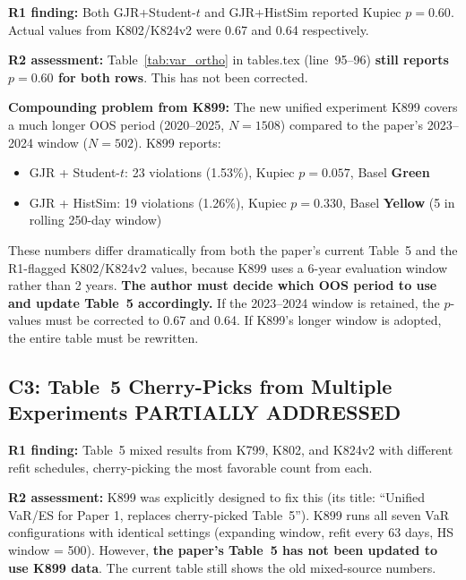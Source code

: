 \documentclass[12pt,a4paper]{article}
\begin{document}
\textbf{R1 finding:} Both GJR+Student-$t$ and GJR+HistSim reported Kupiec $p = 0.60$. Actual values from K802/K824v2 were 0.67 and 0.64 respectively.

\textbf{R2 assessment:} Table~\ref{tab:var_ortho} in tables.tex (line~95--96) \textbf{still reports $p = 0.60$ for both rows}. This has not been corrected.

\textbf{Compounding problem from K899:} The new unified experiment K899 covers a much longer OOS period (2020--2025, $N = 1508$) compared to the paper's 2023--2024 window ($N = 502$). K899 reports:
\begin{itemize}[nosep]
\item GJR + Student-$t$: 23 violations (1.53\%), Kupiec $p = 0.057$, Basel \textbf{Green}
\item GJR + HistSim: 19 violations (1.26\%), Kupiec $p = 0.330$, Basel \textbf{Yellow} (5 in rolling 250-day window)
\end{itemize}
These numbers differ dramatically from both the paper's current Table~5 and the R1-flagged K802/K824v2 values, because K899 uses a 6-year evaluation window rather than 2 years. \textbf{The author must decide which OOS period to use and update Table~5 accordingly.} If the 2023--2024 window is retained, the $p$-values must be corrected to 0.67 and 0.64. If K899's longer window is adopted, the entire table must be rewritten.


\subsection*{C3: Table~5 Cherry-Picks from Multiple Experiments \hfill \textcolor{errorred}{PARTIALLY ADDRESSED}}

\textbf{R1 finding:} Table~5 mixed results from K799, K802, and K824v2 with different refit schedules, cherry-picking the most favorable count from each.

\textbf{R2 assessment:} K899 was explicitly designed to fix this (its title: ``Unified VaR/ES for Paper 1, replaces cherry-picked Table~5''). K899 runs all seven VaR configurations with identical settings (expanding window, refit every 63 days, HS window = 500). However, \textbf{the paper's Table~5 has not been updated to use K899 data}. The current table still shows the old mixed-source numbers.
\end{document}
